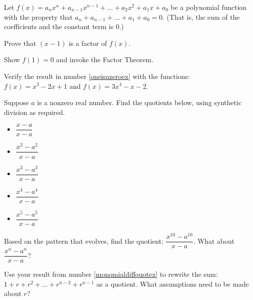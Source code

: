 \documentclass{ximera}
\begin{document}
\begin{problem}\label{oneisazeroex}
Let $f(x) = a_{n} x^{n} + a_{n-1} x^{n-1} + \ldots + a_{2} x^{2} + a_{1} x + a_{0}$ be a polynomial function with the property that $ a_{n}+a_{n-1} + \ldots + a_{1} + a_{0} = 0$.  (That is, the sum of the coefficients and the constant term is $0$.)  

Prove that $(x-1)$ is a factor of $f(x)$.

\begin{hint}
Show $f(1) = 0$ and invoke the Factor Theorem.
\end{hint}
\end{problem}

\begin{problem}
Verify the result in number \ref{oneisazeroex} with the functions: $f(x) = x^3 - 2x + 1$ and  $f(x) = 3x^4-x-2$.    
\end{problem}

\begin{problem}\label{monomialdiffquotex} 
Suppose $a$ is a nonzero real number.  Find the quotients below, using synthetic division as required. 

\begin{itemize}
    \item $\dfrac{x - a}{x-a}$
    \item $\dfrac{x^2 - a^2}{x-a}$ 
    \item $\dfrac{x^3 - a^3}{x-a}$ 
    \item $\dfrac{x^4 - a^4}{x-a}$ 
    \item $\dfrac{x^5 - a^5}{x-a}$ 
\end{itemize}

Based on the pattern that evolves, find the quotient: $\dfrac{x^{10} - a^{10}}{x-a}$.  What about  $\dfrac{x^{n} - a^{n}}{x-a}$?
\end{problem}

\begin{problem}\label{geoseriespreview}
Use your result from number \ref{monomialdiffquotex} to rewrite the sum: $1 + r + r^2 + \dots + r^{n-2} + r^{n-1}$ as a quotient. What assumptions need to be made about $r$?
\end{problem}
\end{document}

